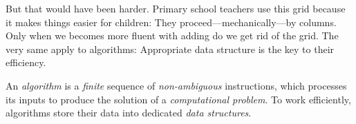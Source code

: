 \documentclass{aldast}
\begin{document}
But that would have been harder. Primary school teachers use this grid
because it makes things easier for children: They
proceed---mechanically---by columns. Only when we becomes more fluent
with adding do we get rid of the grid. The very same apply to
algorithms: Appropriate data structure is the key to their efficiency.

\begin{takeaway}
  An \emph{algorithm} is a \emph{finite} sequence of
  \emph{non-ambiguous} instructions, which processes its inputs to
  produce the solution of a \emph{computational problem}. To work
  efficiently, algorithms store their data into dedicated \emph{data
    structures}.
\end{takeaway}




\end{document}
